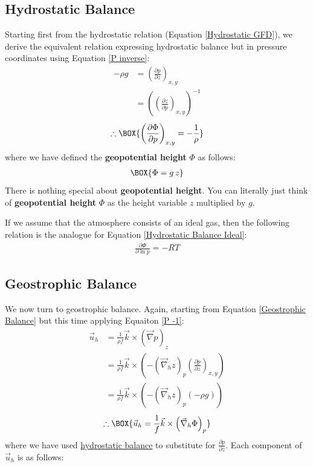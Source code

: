 \subsection{Hydrostatic Balance}

Starting first from the hydrostatic relation (Equation \ref{Hydrostatic GFD}), we derive the equivalent relation expressing hydrostatic balance but in pressure coordinates using Equation \ref{P inverse}:
\begin{align*}
    -\rho g &= \left( \frac{\partial p}{\partial z} \right)_{x,y}
    \\
    &=\left( \left( \frac{\partial z}{\partial p} \right)_{x,y} \right)^{-1}
\end{align*}
\begin{align}
    \label{Hydrostatic Pressure}
    \therefore \BOX{
        \left( \frac{\partial \Phi}{\partial p} \right)_{x,y}
        =-\frac{1}{\rho}
    }
\end{align}
where we have defined the \textbf{geopotential height} $\Phi$ as follows:
\begin{align}
    \BOX{\Phi =g\,z}
\end{align}
There is nothing special about \textbf{geopotential height}. You can literally just think of \textbf{geopotential height} $\Phi$ as the height variable $z$ multiplied by $g$.

If we assume that the atmosphere consists of an ideal gas, then the following relation is the analogue for Equation \ref{Hydrostatic Balance Ideal}:
\begin{align}
    \boxed{\frac{\partial \Phi}{\partial \ln p}=-RT}
    \label{Hydrostatic Pressure Ideal}
\end{align}

\subsection{Geostrophic Balance}

We now turn to geostrophic balance. Again, starting from Equation \ref{Geostrophic Balance} but this time applying Equaiton \ref{P -1}:
\begin{align*}
    \vec{u}_h &= \frac{1}{\rho f}\vec{k}\times\left(\vec{\nabla}p\right)_z
    \\
    &=\frac{1}{\rho f}\vec{k}\times\left( 
        -\left( \vec{\nabla}_h z \right)_p \left( \frac{\partial p}{\partial z} \right)_{x,y}
     \right)
    \\
    &=\frac{1}{\rho f}\vec{k}\times\left( 
        -\left( \vec{\nabla}_h z \right)_p (-\rho g)
    \right)
\end{align*}
\begin{align}
    \label{Geostrophic Pressure}
    \therefore \BOX{
        \vec{u}_h = \frac{1}{f}\vec{k}\times\left( \vec{\nabla}_h \Phi \right)_p
    }
\end{align}
where we have used \hyperref[Hydrostatic GFD Box]{hydrostatic balance} to substitute for $\frac{\partial p}{\partial z}$. Each component of $\vec{u}_h$ is as follows:

